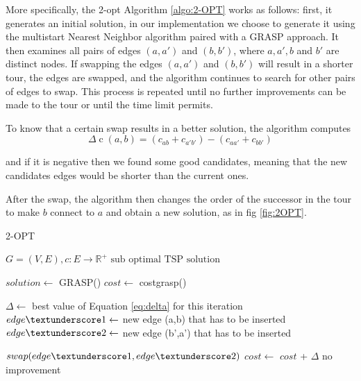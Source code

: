 More specifically, the 2-opt Algorithm \ref{algo:2-OPT} works as follows: first, it generates an initial solution, in our implementation we choose to generate it using the multistart Nearest Neighbor algorithm paired with a GRASP approach. It then examines all pairs of edges $(a,a')$ and $(b,b')$, where $a,a',b$ and $b'$ are distinct nodes. If swapping the edges $(a,a')$ and $(b,b')$ will result in a shorter tour, the edges are swapped, and the algorithm continues to search for other pairs of edges to swap. This process is repeated until no further improvements can be made to the tour or until the time limit permits.

To know that a certain swap results in a better solution, the algorithm computes 
\begin{equation}\label{eq:delta}
\Delta \operatorname{c}(a,b) = (c_{ab} + c_{a'b'}) - (c_{aa'} + c_{bb'})
\end{equation}

and if it is negative then we found some good candidates, meaning that the new candidates edges would be shorter than the current ones.

After the swap, the algorithm then changes the order of the successor in the tour to make $b$ connect to $a$ and obtain a new solution, as in fig \ref{fig:2OPT}.

\begin{algorithm}[!h]
    \caption{2-OPT}\label{algo:2-OPT}
    \begin{algorithmic}[1]
    \Require $G = (V,E), c:E \to \mathbb{R}^+$
    \Ensure $\text{sub optimal TSP solution}$


    \State $solution \gets$ GRASP()
    \State $cost \gets$ cost\textunderscore grasp()
    

    
   
   
    \State $\Delta \gets$  best value of Equation \ref{eq:delta} for this iteration
    \State $edge\textunderscore 1 \gets$ new edge (a,b) that has to be inserted
    \State $edge\textunderscore 2 \gets$ new edge (b',a') that has to be inserted
    
    
    \State $swap(edge\textunderscore 1,edge\textunderscore 2) $
    \State $cost \gets  $ $cost$ + $\Delta$
    \Else 
        \State no improvement
    \EndIf
    

    \EndWhile

    \end{algorithmic}
\end{algorithm}

